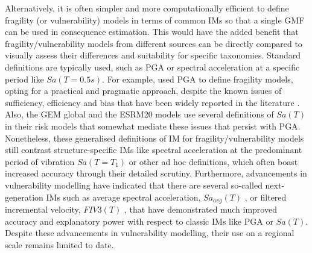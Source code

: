 Alternatively, it is often simpler and more computationally efficient to define fragility (or vulnerability) models in terms of common \acp{IM} so that a single \ac{GMF} can be used in consequence estimation. This would have the added benefit that fragility/vulnerability models from different sources can be directly compared to visually assess their differences and suitability for specific taxonomies. Standard definitions are typically used, such as \ac{PGA} or spectral acceleration at a specific period like $Sa(T=0.5s)$. For example, \citet{Rosti2021} used \ac{PGA} to define fragility models, opting for a practical and pragmatic approach, despite the known issues of sufficiency, efficiency and bias that have been widely reported in the literature \citep[e.g.,][]{ShomeEtAl1998, MehdizadehEtAl2017, GhimireEtAl2021, OReilly2021}. Also, the \ac{GEM} global \citep{Martins2021-BEE} and the \ac{ESRM20} \citep{ESRM20} models use several definitions of $Sa(T)$ in their risk models that somewhat mediate these issues that persist with \ac{PGA}. Nonetheless, these generalised definitions of \ac{IM} for fragility/vulnerability models still contrast structure-specific \acp{IM} like spectral acceleration at the predominant period of vibration $Sa(T=T_1)$ or other ad hoc definitions, which often boast increased accuracy through their detailed scrutiny. Furthermore, advancements in vulnerability modelling have indicated that there are several so-called next-generation \acp{IM} such as average spectral acceleration, $Sa_{avg}(T)$ \citep[e.g.,][]{Eads2015, Kazantzi2015}, or filtered incremental velocity, $FIV3(T)$ \citep{Davalos2019}, that have demonstrated much improved accuracy and explanatory power with respect to classic \acp{IM} like \ac{PGA} or $Sa(T)$. Despite these advancements in vulnerability modelling, their use on a regional scale remains limited to date.

